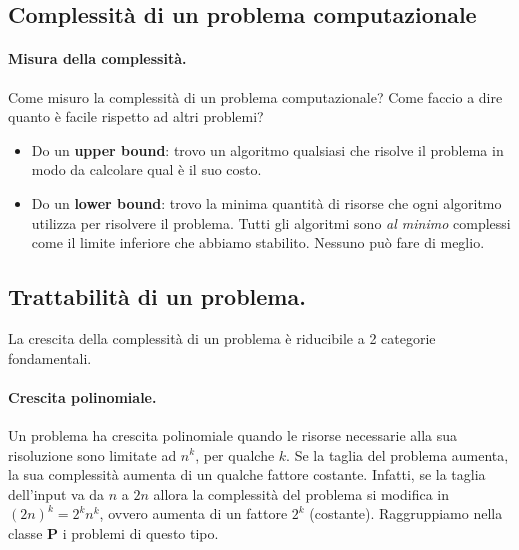 \documentclass[a4paper]{article}
\theoremstyle{definition}
\newcommand{\p}{\mathbf{P}}
\begin{document}
		\subsection{Complessità di un problema computazionale}
		\paragraph{Misura della complessità.}
			Come misuro la complessità di un problema computazionale? Come faccio a dire quanto è facile rispetto ad altri problemi?
			\begin{itemize}
				\item Do un \textbf{upper bound}: trovo un algoritmo qualsiasi che risolve il problema in modo da calcolare qual è il suo costo.
				\item Do un \textbf{lower bound}: trovo la minima quantità di risorse che ogni algoritmo utilizza per risolvere il problema. Tutti gli algoritmi sono \textit{al minimo} complessi come il limite inferiore che abbiamo stabilito. Nessuno può fare di meglio.
			\end{itemize}
			
			\begin{figure}[h]
				\centering
			\end{figure}
			
			\subsection{Trattabilità di un problema.} La crescita della complessità di un problema è riducibile a 2 categorie fondamentali.
			
			\paragraph{Crescita polinomiale.} Un problema ha crescita polinomiale quando le risorse necessarie alla sua risoluzione sono limitate ad $n^k$, per qualche $k$. Se la taglia del problema aumenta, la sua complessità aumenta di un qualche fattore costante. Infatti, se la taglia dell'input va da $n$ a $2n$ allora la complessità del problema si modifica in $(2n)^k = 2^kn^k$, ovvero aumenta di un fattore $2^k$ (costante). Raggruppiamo nella classe $\p$ i problemi di questo tipo.
			
\end{document}
